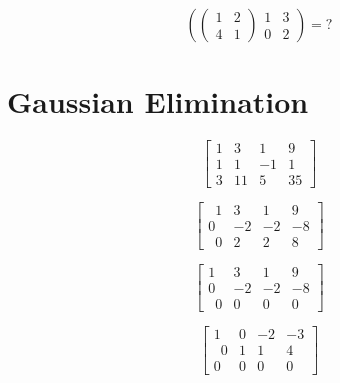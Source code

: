 \documentclass{article}
\begin{document}
\[ \left(
\left(
\begin{array}{cc}
1 & 2 \\ 
4 & 1
\end{array} \right)
\begin{array}{cc}
1 & 3 \\ 
0 & 2
\end{array} \right) = ? \]

\newpage
\section*{Gaussian Elimination}
\[
\left[\begin{array}{rrr|r}
1 & 3 & 1 & 9 \\
1 & 1 & -1 & 1 \\
3 & 11 & 5 & 35
\end{array}\right]
\]

\[
\left[\begin{array}{rrr|r}
\phantom{0}1 & 3 & 1 & 9 \\
0 & -2 & -2 & -8 \\
\phantom{0}0 & 2 & 2 & 8
\end{array}\right]
\]

\[
\left[\begin{array}{rrr|r}
1 & 3 & 1 & 9 \\
0 & -2 & -2 & -8 \\
\phantom{0}0 & 0 & 0 & 0
\end{array}\right]
\]

\[
\left[\begin{array}{rrr|r}
1 & 0 & -2 & -3 \\
\phantom{0}0 & 1 & 1 & 4 \\
0 & 0 & 0 & 0
\end{array}\right] 
\]
\end{document}
